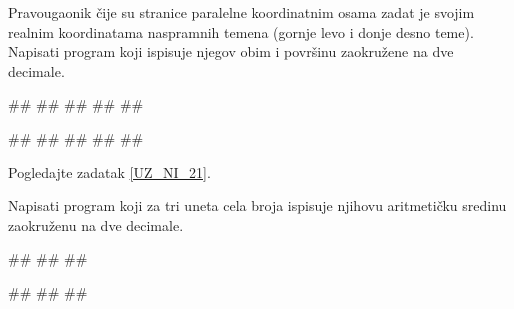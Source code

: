 \begin{Exercise}[label=UZ_NI_25] 
Pravougaonik čije su stranice paralelne koordinatnim osama zadat je svojim realnim 
koordinatama naspramnih temena (gornje levo i donje desno teme). Napisati program koji 
ispisuje njegov obim i površinu zaokružene na dve decimale. 

\begin{maxitest}
\begin{upotreba}{1}
#\naslovInt#
##
##
##
##
\end{upotreba}
\end{maxitest}

\begin{maxitest}
\begin{upotreba}{2}
#\naslovInt#
##
##
##
##
\end{upotreba}
\end{maxitest}
\end{Exercise}
\ifresenja
\begin{Answer}[ref=UZ_NI_25]
Pogledajte zadatak \ref{UZ_NI_21}.
\end{Answer}
\fi


\begin{Exercise}[label=UZ_NI_26] 
Napisati program koji za tri uneta cela broja ispisuje njihovu aritmetičku sredinu zaokruženu na dve decimale.

\begin{miditest}
\begin{upotreba}{1}
#\naslovInt#
##
##
\end{upotreba}
\end{miditest}
\begin{miditest}
\begin{upotreba}{2}
#\naslovInt#
##
##
\end{upotreba}
\end{miditest}

\end{Exercise}
\ifresenja
\begin{Answer}[ref=UZ_NI_26]
\end{Answer}
\fi

